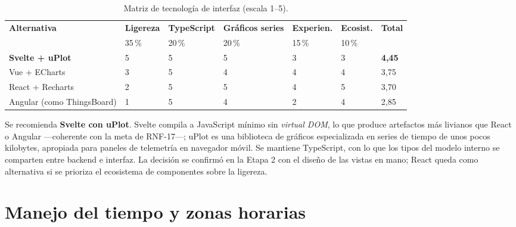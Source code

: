 \begin{table}[H]
\centering\footnotesize
\begin{tablaseg}
\begin{tabular}{@{}L{3.4cm}C{1.6cm}C{1.6cm}C{1.7cm}C{1.5cm}C{1.5cm}C{1.1cm}@{}}
\toprule
\textbf{Alternativa} & \textbf{Ligereza} & \textbf{TypeScript} & \textbf{Gráficos series} & \textbf{Experien.} & \textbf{Ecosist.} & \textbf{Total} \\
 & 35\,\% & 20\,\% & 20\,\% & 15\,\% & 10\,\% & \\
\midrule
\textbf{Svelte + uPlot} & 5 & 5 & 5 & 3 & 3 & \textbf{4,45} \\
Vue + ECharts & 3 & 5 & 4 & 4 & 4 & 3,75 \\
React + Recharts & 2 & 5 & 5 & 4 & 5 & 3,70 \\
Angular (como ThingsBoard) & 1 & 5 & 4 & 2 & 4 & 2,85 \\
\bottomrule
\end{tabular}
\end{tablaseg}
\caption{Matriz de tecnología de interfaz (escala 1--5).}
\label{tab:frontend}
\end{table}

Se recomienda \textbf{Svelte con uPlot}. Svelte compila a JavaScript mínimo sin \emph{virtual DOM},
lo que produce artefactos más livianos que React o Angular —coherente con la meta de RNF-17—; uPlot es una biblioteca de
gráficos especializada en series de tiempo de unos pocos kilobytes, apropiada para paneles de
telemetría en navegador móvil. Se mantiene TypeScript, con lo que los tipos del modelo interno se
comparten entre backend e interfaz. La decisión se confirmó en la Etapa 2 con el diseño de las
vistas en mano; React queda como alternativa si se prioriza el ecosistema de componentes sobre la
ligereza.

\section{Manejo del tiempo y zonas horarias}
\label{sec:tiempo}

